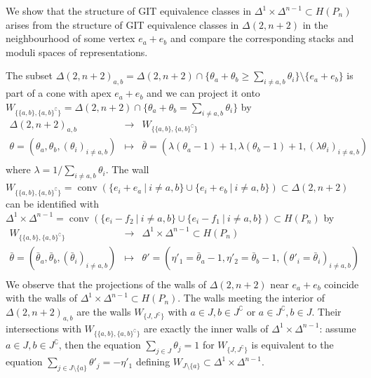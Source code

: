 \documentclass[10pt,a4paper]{amsart}
\theoremstyle{definition}
\DeclareMathOperator{\conv}{conv}
\begin{document}
We show that the structure of GIT equivalence classes in 
$\Delta^1\times\Delta^{n-1}\subset H(P_n)$ arises from the
structure of GIT equivalence classes in $\Delta(2,n+2)$ in the 
neighbourhood of some vertex $e_a+e_b$ and compare the corresponding
stacks and moduli spaces of representations.


The subset $\Delta(2,n+2)_{a,b}=\Delta(2,n+2)\cap
\{\theta_a+\theta_b\geq\sum_{i\neq a,b}\theta_i\}\setminus\{e_a+e_b\}$ 
is part of a cone with apex $e_a+e_b$ and we can project it onto
$W_{\{\{a,b\},\{a,b\}^\complement\}}=\Delta(2,n+2)\cap
\{\theta_a+\theta_b=\sum_{i\neq a,b}\theta_i\}$ by
\[
\begin{array}{rcl}
\Delta(2,n+2)_{a,b}&\to&W_{\{\{a,b\},\{a,b\}^\complement\}}\\
\theta=(\theta_a,\theta_b,(\theta_i)_{i\neq a,b})&\mapsto&
\bar{\theta}=(\lambda(\theta_a-1)+1,\lambda(\theta_b-1)+1,(\lambda\theta_i)_{i\neq a,b})\\
\end{array}
\]
where $\lambda=1/\sum_{i\neq a,b}\theta_i$.
The wall $W_{\{\{a,b\},\{a,b\}^\complement\}}=\conv(\{e_i+e_a\:|\:i\neq a,b\}\cup
\{e_i+e_b\:|\:i\neq a,b\})\subset\Delta(2,n+2)$ can be identified with 
$\Delta^1\times\Delta^{n-1}=\conv(\{e_i-f_2\:|\:i\neq a,b\}\cup
\{e_i-f_1\:|\:i\neq a,b\})\subset H(P_n)$ by 
\[
\begin{array}{rcl}
W_{\{\{a,b\},\{a,b\}^\complement\}}&\to&\Delta^1\times\Delta^{n-1}\subset H(P_n)\\[1mm]
\bar{\theta}=(\bar{\theta}_a,\bar{\theta}_b,(\bar{\theta}_i)_{i\neq a,b})&\mapsto&
\theta'=(\eta'_1=\bar{\theta}_a-1,\eta'_2=\bar{\theta}_b-1,
(\theta'_i=\bar{\theta}_i)_{i\neq a,b})\\
\end{array}
\]
We observe that the projections of the walls of $\Delta(2,n+2)$ near $e_a+e_b$
coincide with the walls of $\Delta^1\times\Delta^{n-1}\subset H(P_n)$. 
The walls meeting the interior of $\Delta(2,n+2)_{a,b}$ are the walls 
$W_{\{J,J^\complement\}}$ with $a\in J,b\in J^\complement$ or $a\in J^\complement,b\in J$. 
Their intersections with $W_{\{\{a,b\},\{a,b\}^\complement\}}$ are exactly the 
inner walls of $\Delta^1\times\Delta^{n-1}$: assume $a\in J, b\in J^\complement$, 
then the equation $\sum_{j\in J}\theta_j=1$ for $W_{\{J,J^\complement\}}$ 
is equivalent to the equation $\sum_{j\in J\setminus\{a\}}\theta'_j=-\eta'_1$
defining $W_{J\setminus\{a\}}\subset\Delta^1\times\Delta^{n-1}$.
\end{document}
